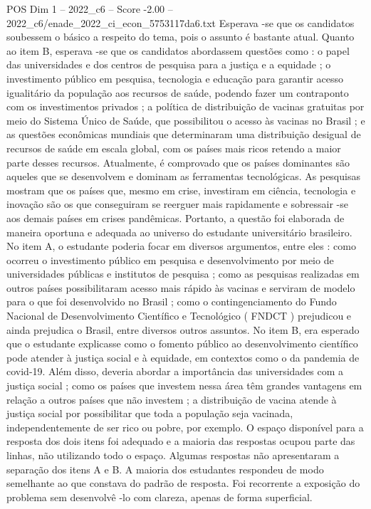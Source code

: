 \begin{textsample}{POS Dim 1 – 2022\_c6 – Score -2.00 – 2022\_c6/enade\_2022\_ci\_econ\_5753117da6.txt}
Esperava -se que os candidatos soubessem o básico a respeito do tema, pois o assunto é bastante atual.
Quanto ao item B, esperava -se que os candidatos abordassem questões como : o papel das universidades e dos centros de pesquisa para a justiça e a equidade ; o investimento público em pesquisa, tecnologia e educação para garantir acesso igualitário da população aos recursos de saúde, podendo fazer um contraponto com os investimentos privados ; a política de distribuição de vacinas gratuitas por meio do Sistema Único de Saúde, que possibilitou o acesso às vacinas no Brasil ; e as questões econômicas mundiais que determinaram uma distribuição desigual de recursos de saúde em escala global, com os países mais ricos retendo a maior parte desses recursos.
Atualmente, é comprovado que os países dominantes são aqueles que se desenvolvem e dominam as ferramentas tecnológicas.
As pesquisas mostram que os países que, mesmo em crise, investiram em ciência, tecnologia e inovação são os que conseguiram se reerguer mais rapidamente e sobressair -se aos demais países em crises pandêmicas.
Portanto, a questão foi elaborada de maneira oportuna e adequada ao universo do estudante universitário brasileiro.
No item A, o estudante poderia focar em diversos argumentos, entre eles : como ocorreu o investimento público em pesquisa e desenvolvimento por meio de universidades públicas e institutos de pesquisa ; como as pesquisas realizadas em outros países possibilitaram acesso mais rápido às vacinas e serviram de modelo para o que foi desenvolvido no Brasil ; como o contingenciamento do Fundo Nacional de Desenvolvimento Científico e Tecnológico ( FNDCT ) prejudicou e ainda prejudica o Brasil, entre diversos outros assuntos.
No item B, era esperado que o estudante explicasse como o fomento público ao desenvolvimento científico pode atender à justiça social e à equidade, em contextos como o da pandemia de covid-19.
Além disso, deveria abordar a importância das universidades com a justiça social ; como os países que investem nessa área têm grandes vantagens em relação a outros países que não investem ; a distribuição de vacina atende à justiça social por possibilitar que toda a população seja vacinada, independentemente de ser rico ou pobre, por exemplo.
O espaço disponível para a resposta dos dois itens foi adequado e a maioria das respostas ocupou parte das linhas, não utilizando todo o espaço.
Algumas respostas não apresentaram a separação dos itens A e B.
A maioria dos estudantes respondeu de modo semelhante ao que constava do padrão de resposta.
Foi recorrente a exposição do problema sem desenvolvê -lo com clareza, apenas de forma superficial.

\end{textsample}
